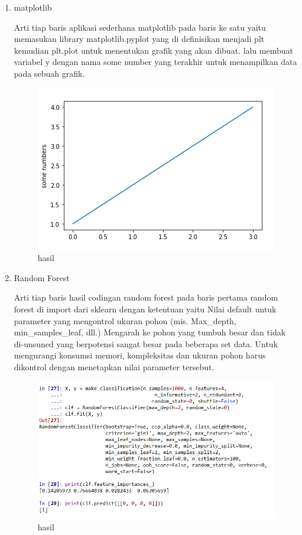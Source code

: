\begin{enumerate}
\item matplotlib\par
Arti tiap baris aplikasi sederhana matplotlib pada baris ke satu yaitu memasukan library matplotlib.pyplot yang di definisikan menjadi plt kemudian plt.plot untuk menentukan grafik yang akan dibuat. lalu membuat variabel y dengan nama some number yang terakhir untuk menampilkan data pada sebuah grafik.

\begin{figure}[ht]
\centering
\includegraphics[scale=0.5]{figures/1174050/chapter3/6.PNG}
\caption{hasil}
\label{contoh}
\end{figure}

\item Random Forest\par
Arti tiap baris hasil codingan random forest pada baris pertama random forest di import dari sklearn dengan ketentuan yaitu Nilai default untuk parameter yang mengontrol ukuran pohon (mis. Max\_depth, min\_samples\_leaf, dll.) Mengarah ke pohon yang tumbuh besar dan tidak di-unsuned yang berpotensi sangat besar pada beberapa set data. Untuk mengurangi konsumsi memori, kompleksitas dan ukuran pohon harus dikontrol dengan menetapkan nilai parameter tersebut.

\begin{figure}[ht]
\centering
\includegraphics[scale=0.5]{figures/1174050/chapter3/7.PNG}
\caption{hasil}
\label{contoh}
\end{figure}


\end{enumerate}
